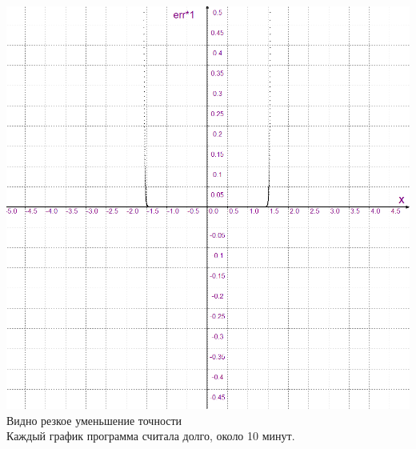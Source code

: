 \documentclass[12pt,a4paper]{scrartcl}
\begin{document}
		\includegraphics[width=\linewidth]{graph2} \\
		
		Видно резкое уменьшение точности \\
		Каждый график программа считала долго, около 10 минут. \\
	
\end{document}
